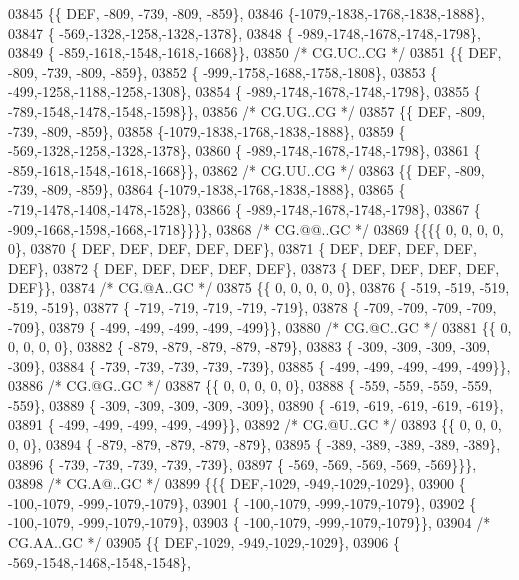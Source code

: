 \begin{DoxyCode}
03845 \{\{  DEF, -809, -739, -809, -859\},
03846 \{-1079,-1838,-1768,-1838,-1888\},
03847 \{ -569,-1328,-1258,-1328,-1378\},
03848 \{ -989,-1748,-1678,-1748,-1798\},
03849 \{ -859,-1618,-1548,-1618,-1668\}\},
03850 \textcolor{comment}{/* CG.UC..CG */}
03851 \{\{  DEF, -809, -739, -809, -859\},
03852 \{ -999,-1758,-1688,-1758,-1808\},
03853 \{ -499,-1258,-1188,-1258,-1308\},
03854 \{ -989,-1748,-1678,-1748,-1798\},
03855 \{ -789,-1548,-1478,-1548,-1598\}\},
03856 \textcolor{comment}{/* CG.UG..CG */}
03857 \{\{  DEF, -809, -739, -809, -859\},
03858 \{-1079,-1838,-1768,-1838,-1888\},
03859 \{ -569,-1328,-1258,-1328,-1378\},
03860 \{ -989,-1748,-1678,-1748,-1798\},
03861 \{ -859,-1618,-1548,-1618,-1668\}\},
03862 \textcolor{comment}{/* CG.UU..CG */}
03863 \{\{  DEF, -809, -739, -809, -859\},
03864 \{-1079,-1838,-1768,-1838,-1888\},
03865 \{ -719,-1478,-1408,-1478,-1528\},
03866 \{ -989,-1748,-1678,-1748,-1798\},
03867 \{ -909,-1668,-1598,-1668,-1718\}\}\}\},
03868 \textcolor{comment}{/* CG.@@..GC */}
03869 \{\{\{\{    0,    0,    0,    0,    0\},
03870 \{  DEF,  DEF,  DEF,  DEF,  DEF\},
03871 \{  DEF,  DEF,  DEF,  DEF,  DEF\},
03872 \{  DEF,  DEF,  DEF,  DEF,  DEF\},
03873 \{  DEF,  DEF,  DEF,  DEF,  DEF\}\},
03874 \textcolor{comment}{/* CG.@A..GC */}
03875 \{\{    0,    0,    0,    0,    0\},
03876 \{ -519, -519, -519, -519, -519\},
03877 \{ -719, -719, -719, -719, -719\},
03878 \{ -709, -709, -709, -709, -709\},
03879 \{ -499, -499, -499, -499, -499\}\},
03880 \textcolor{comment}{/* CG.@C..GC */}
03881 \{\{    0,    0,    0,    0,    0\},
03882 \{ -879, -879, -879, -879, -879\},
03883 \{ -309, -309, -309, -309, -309\},
03884 \{ -739, -739, -739, -739, -739\},
03885 \{ -499, -499, -499, -499, -499\}\},
03886 \textcolor{comment}{/* CG.@G..GC */}
03887 \{\{    0,    0,    0,    0,    0\},
03888 \{ -559, -559, -559, -559, -559\},
03889 \{ -309, -309, -309, -309, -309\},
03890 \{ -619, -619, -619, -619, -619\},
03891 \{ -499, -499, -499, -499, -499\}\},
03892 \textcolor{comment}{/* CG.@U..GC */}
03893 \{\{    0,    0,    0,    0,    0\},
03894 \{ -879, -879, -879, -879, -879\},
03895 \{ -389, -389, -389, -389, -389\},
03896 \{ -739, -739, -739, -739, -739\},
03897 \{ -569, -569, -569, -569, -569\}\}\},
03898 \textcolor{comment}{/* CG.A@..GC */}
03899 \{\{\{  DEF,-1029, -949,-1029,-1029\},
03900 \{ -100,-1079, -999,-1079,-1079\},
03901 \{ -100,-1079, -999,-1079,-1079\},
03902 \{ -100,-1079, -999,-1079,-1079\},
03903 \{ -100,-1079, -999,-1079,-1079\}\},
03904 \textcolor{comment}{/* CG.AA..GC */}
03905 \{\{  DEF,-1029, -949,-1029,-1029\},
03906 \{ -569,-1548,-1468,-1548,-1548\},

\end{DoxyCode}
